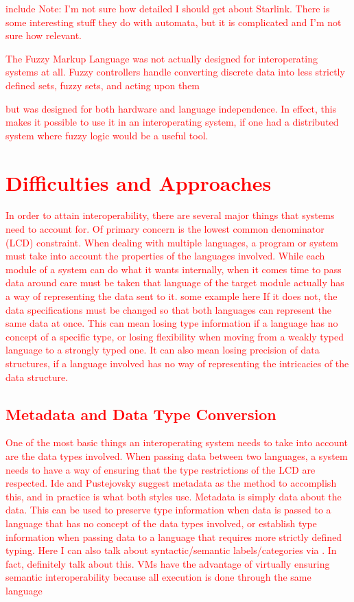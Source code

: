 \documentclass{sig-alternate}
\newcommand{\mycomment}[1]{\textcolor{red}{#1}}
\begin{document}
\mycomment{include
\mycomment{Note: I'm not sure how detailed I should get about Starlink. There is some interesting stuff they do with automata, but it is complicated and I'm not sure how relevant.}

The Fuzzy Markup Language\cite{Acampora:2013} was not actually designed for interoperating systems at all. Fuzzy controllers handle converting discrete data into less strictly defined sets, fuzzy sets, and acting upon them 

 but was designed for both hardware and language independence. In effect, this makes it possible to use it in an interoperating system, if one had a distributed system where fuzzy logic would be a useful tool.

\section{Difficulties and Approaches}\label{approaches}
In order to attain interoperability, there are several major things that systems need to account for. Of primary concern is the lowest common denominator (LCD) constraint.
When dealing with multiple languages, a program or system must take into account the properties of the languages involved. While each module of a system can do what it wants internally, when it comes time to pass data around care must be taken that language of the target module actually has a way of representing the data sent to it. \mycomment{some example here}
If it does not, the data specifications must be changed so that both languages can represent the same data at once. This can mean losing type information if a language has no concept of a specific type, or losing flexibility when moving from a weakly typed language to a strongly typed one. It can also mean losing precision of data structures, if a language involved has no way of representing the intricacies of the data structure.

\subsection{Metadata and Data Type Conversion}\label{metadata} \mycomment{\cite{Ide:2010, Bromberg:2011, Hamilton:2003}}
One of the most basic things an interoperating system needs to take into account are the data types involved. 
When passing data between two languages, a system needs to have a way of ensuring that the type restrictions of the LCD are respected. Ide and Pustejovsky \cite{Ide:2010} suggest metadata as the method to accomplish this, and in practice is what both styles use. Metadata is simply data about the data. This can be used to preserve type information when data is passed to a language that has no concept of the data types involved, or establish type information when passing data to a language that requires more strictly defined typing.
\mycomment{Here I can also talk about syntactic/semantic labels/categories via \cite{Ide:2010}. In fact, definitely talk about this. VMs have the advantage of virtually ensuring semantic interoperability because all execution is done through the same language}
}
\end{document}
